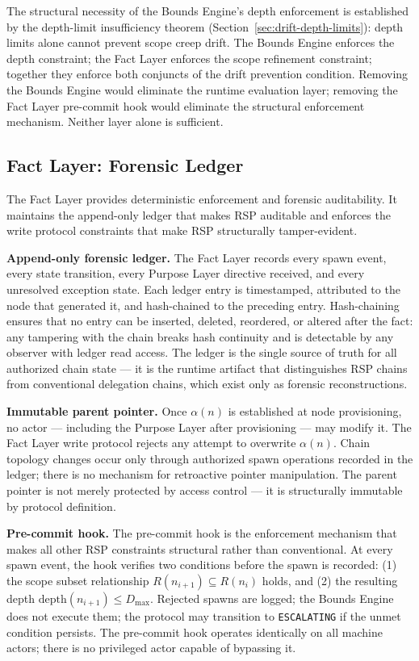 \medskip
The structural necessity of the Bounds Engine's depth enforcement is established by the depth-limit insufficiency theorem (Section~\ref{sec:drift-depth-limits}): depth limits alone cannot prevent scope creep drift. The Bounds Engine enforces the depth constraint; the Fact Layer enforces the scope refinement constraint; together they enforce both conjuncts of the drift prevention condition. Removing the Bounds Engine would eliminate the runtime evaluation layer; removing the Fact Layer pre-commit hook would eliminate the structural enforcement mechanism. Neither layer alone is sufficient.

\subsection{Fact Layer: Forensic Ledger}
\label{sec:rs-fact-ledger}

The Fact Layer provides deterministic enforcement and forensic auditability. It maintains the append-only ledger that makes RSP auditable and enforces the write protocol constraints that make RSP structurally tamper-evident.

\medskip
\noindent\textbf{Append-only forensic ledger.} The Fact Layer records every spawn event, every state transition, every Purpose Layer directive received, and every unresolved exception state. Each ledger entry is timestamped, attributed to the node that generated it, and hash-chained to the preceding entry. Hash-chaining ensures that no entry can be inserted, deleted, reordered, or altered after the fact: any tampering with the chain breaks hash continuity and is detectable by any observer with ledger read access. The ledger is the single source of truth for all authorized chain state — it is the runtime artifact that distinguishes RSP chains from conventional delegation chains, which exist only as forensic reconstructions.

\medskip
\noindent\textbf{Immutable parent pointer.} Once $\alpha(n)$ is established at node provisioning, no actor — including the Purpose Layer after provisioning — may modify it. The Fact Layer write protocol rejects any attempt to overwrite $\alpha(n)$. Chain topology changes occur only through authorized spawn operations recorded in the ledger; there is no mechanism for retroactive pointer manipulation. The parent pointer is not merely protected by access control — it is structurally immutable by protocol definition.

\medskip
\noindent\textbf{Pre-commit hook.} The pre-commit hook is the enforcement mechanism that makes all other RSP constraints structural rather than conventional. At every spawn event, the hook verifies two conditions before the spawn is recorded: (1) the scope subset relationship $R(n_{i+1}) \subseteq R(n_i)$ holds, and (2) the resulting depth $\text{depth}(n_{i+1}) \leq D_{\text{max}}$. Rejected spawns are logged; the Bounds Engine does not execute them; the protocol may transition to \texttt{ESCALATING} if the unmet condition persists. The pre-commit hook operates identically on all machine actors; there is no privileged actor capable of bypassing it.

